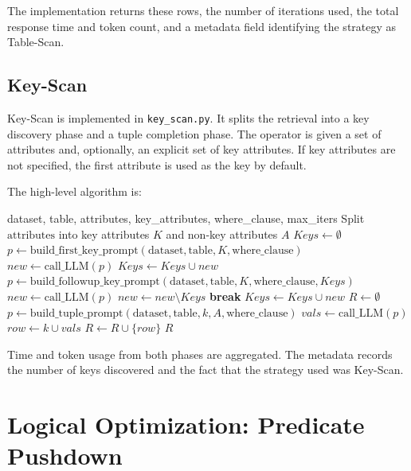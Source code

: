 \documentclass[11pt]{article}
\begin{document}
The implementation returns these rows, the number of iterations used, the total response time and token count, and a metadata field identifying the strategy as Table-Scan.

\subsection{Key-Scan}

Key-Scan is implemented in \texttt{key\_scan.py}. It splits the retrieval into a key discovery phase and a tuple completion phase. The operator is given a set of attributes and, optionally, an explicit set of key attributes. If key attributes are not specified, the first attribute is used as the key by default.

The high-level algorithm is:

\begin{algorithm}[h]
\caption{Key-Scan}
\begin{algorithmic}[1]
\Require dataset, table, attributes, key\_attributes, where\_clause, max\_iters
\State Split $\text{attributes}$ into key attributes $K$ and non-key attributes $A$
\State $Keys \gets \emptyset$
\State $p \gets \text{build\_first\_key\_prompt}(\text{dataset}, \text{table}, K, \text{where\_clause})$
\State $new \gets \text{call\_LLM}(p)$
\State $Keys \gets Keys \cup new$
  \State $p \gets \text{build\_followup\_key\_prompt}(\text{dataset}, \text{table}, K, \text{where\_clause}, Keys)$
  \State $new \gets \text{call\_LLM}(p)$
  \State $new \gets new \setminus Keys$
    \State \textbf{break}
  \EndIf
  \State $Keys \gets Keys \cup new$
\EndFor
{}
\State $R \gets \emptyset$
  \State $p \gets \text{build\_tuple\_prompt}(\text{dataset}, \text{table}, k, A, \text{where\_clause})$
  \State $vals \gets \text{call\_LLM}(p)$
  \State $row \gets k \cup vals$
  \State $R \gets R \cup \{row\}$
\EndFor
\State \Return $R$
\end{algorithmic}
\end{algorithm}

Time and token usage from both phases are aggregated. The metadata records the number of keys discovered and the fact that the strategy used was Key-Scan.

\section{Logical Optimization: Predicate Pushdown}
\end{document}
